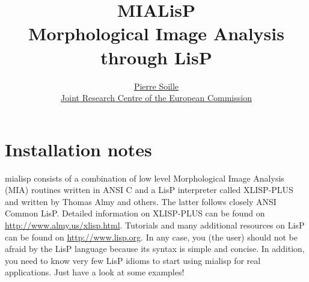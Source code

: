 \documentclass{book}
\renewcommand{\htmladdnormallink}[2]{\href{#2}{#1}}
\begin{document}

\title{MIALisP\\Morphological Image Analysis through LisP}
\author{\htmladdnormallink{Pierre Soille}{mailto:Pierre.Soille@jrc.ec.europa.eut?subject=MIALisP}\\
\htmladdnormallink{Joint Research Centre of the European Commission}{http://www.jrc.ec.europa.eu}}


\setcounter{tocdepth}{2}


\maketitle


\cleardoublepage
{}
\tableofcontents

\newpage
{}

\chapter{Installation notes}
mialisp consists of a combination of low level Morphological Image Analysis (MIA) routines written in ANSI C and a LisP interpreter called XLISP-PLUS and written by Thomas Almy and others.  The latter follows closely ANSI Common LisP.  Detailed information on XLISP-PLUS can be found on \htmladdnormallink{http://www.almy.us/xlisp.html}{http://www.almy.us/xlisp.html}.  Tutorials and many additional resources on LisP can be found on \htmladdnormallink{http://www.lisp.org}{http://www.lisp.org}.  In any case, you (the user) should not be afraid by the LisP language because its syntax is simple and concise.  In addition, you need to know very few LisP idioms to start using mialisp for real applications.  Just have a look at some examples!
\end{document}
